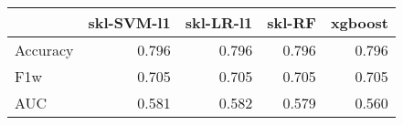 \begin{tabular}{lrrrr}
\toprule
{} &  skl-SVM-l1 &  skl-LR-l1 &  skl-RF &  xgboost \\
\midrule
Accuracy &       0.796 &      0.796 &   0.796 &    0.796 \\
F1w      &       0.705 &      0.705 &   0.705 &    0.705 \\
AUC      &       0.581 &      0.582 &   0.579 &    0.560 \\
\bottomrule
\end{tabular}
